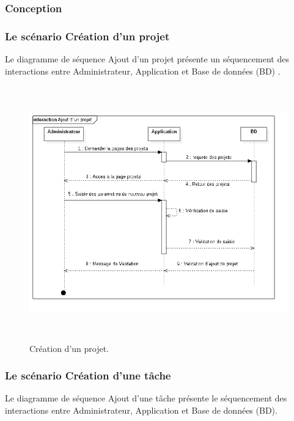 \subsubsection{Conception}
\subsubsection{  Le sc\'{e}nario \guillemotleft{} Cr\'{e}ation d'un projet \guillemotright{}}

Le diagramme de s\'{e}quence \guillemotleft{} Ajout d'un projet \guillemotright{} pr\'{e}sente un s\'{e}quencement
des interactions entre Administrateur, Application et Base de donn\'{e}es (BD) .


\begin{figure}[H]
\center
\includegraphics[width=14cm,height=11cm]{./figures/seq/B.png}
\caption{ Cr\'{e}ation d'un projet.}
\end{figure}

\newpage
\subsubsection{Le sc\'{e}nario \guillemotleft{} Cr\'{e}ation d'une t\^{a}che\guillemotright{}}
Le diagramme de s\'{e}quence \guillemotleft{} Ajout d'une t\^{a}che \guillemotright{} pr\'{e}sente le s\'{e}quencement
des interactions entre Administrateur, Application et Base de donn\'{e}es (BD).

